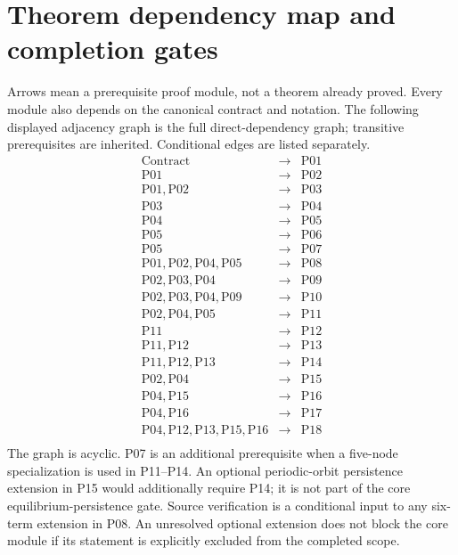 \section{Theorem dependency map and completion gates}
\label{sec:dependency-map}
Arrows mean a prerequisite proof module, not a theorem already proved.
Every module also depends on the canonical contract and notation. The
following displayed adjacency graph is the full direct-dependency graph;
transitive prerequisites are inherited. Conditional edges are listed separately.
\[
\begin{array}{rcl}
\text{Contract}&\longrightarrow&\mathrm{P01}\\
\mathrm{P01}&\longrightarrow&\mathrm{P02}\\
\mathrm{P01},\mathrm{P02}&\longrightarrow&\mathrm{P03}\\
\mathrm{P03}&\longrightarrow&\mathrm{P04}\\
\mathrm{P04}&\longrightarrow&\mathrm{P05}\\
\mathrm{P05}&\longrightarrow&\mathrm{P06}\\
\mathrm{P05}&\longrightarrow&\mathrm{P07}\\
\mathrm{P01},\mathrm{P02},\mathrm{P04},\mathrm{P05}&\longrightarrow&\mathrm{P08}\\
\mathrm{P02},\mathrm{P03},\mathrm{P04}&\longrightarrow&\mathrm{P09}\\
\mathrm{P02},\mathrm{P03},\mathrm{P04},\mathrm{P09}&\longrightarrow&\mathrm{P10}\\
\mathrm{P02},\mathrm{P04},\mathrm{P05}&\longrightarrow&\mathrm{P11}\\
\mathrm{P11}&\longrightarrow&\mathrm{P12}\\
\mathrm{P11},\mathrm{P12}&\longrightarrow&\mathrm{P13}\\
\mathrm{P11},\mathrm{P12},\mathrm{P13}&\longrightarrow&\mathrm{P14}\\
\mathrm{P02},\mathrm{P04}&\longrightarrow&\mathrm{P15}\\
\mathrm{P04},\mathrm{P15}&\longrightarrow&\mathrm{P16}\\
\mathrm{P04},\mathrm{P16}&\longrightarrow&\mathrm{P17}\\
\mathrm{P04},\mathrm{P12},\mathrm{P13},\mathrm{P15},\mathrm{P16}&\longrightarrow&\mathrm{P18}\\
\end{array}
\]
The graph is acyclic. P07 is an additional prerequisite when a five-node
specialization is used in P11--P14. An optional periodic-orbit persistence
extension in P15 would additionally require P14; it is not part of the core
equilibrium-persistence gate. Source verification is a conditional input to
any six-term extension in P08. An unresolved optional extension does not block
the core module if its statement is explicitly excluded from the completed scope.


